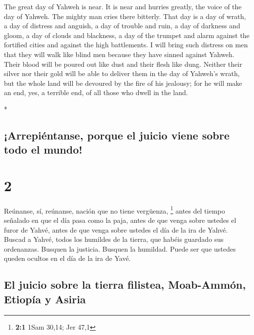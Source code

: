 \begin{paracol}{2}
\begin{otherlanguage}{english}
 The great day of Yahweh is near. It is near and hurries
greatly, the voice of the day of Yahweh. The mighty man cries there
bitterly.  That day is a day of wrath, a day of distress
and anguish, a day of trouble and ruin, a day of darkness and gloom, a
day of clouds and blackness,  a day of the trumpet and
alarm against the fortified cities and against the high battlements.
 I will bring such distress on men that they will walk
like blind men because they have sinned against Yahweh. Their blood will
be poured out like dust and their flesh like dung. 
Neither their silver nor their gold will be able to deliver them in the
day of Yahweh's wrath, but the whole land will be devoured by the fire
of his jealousy; for he will make an end, yes, a terrible end, of all
those who dwell in the land.

\end{otherlanguage}

\switchcolumn[0]*

\hypertarget{arrepiuxe9ntanse-porque-el-juicio-viene-sobre-todo-el-mundo}{%
\subsection{¡Arrepiéntanse, porque el juicio viene sobre todo el
mundo!}\label{arrepiuxe9ntanse-porque-el-juicio-viene-sobre-todo-el-mundo}}

\hypertarget{section-2}{%
\section{2}\label{section-2}}

 Reúnanse, sí, reúnanse, nación que no tiene vergüenza,
\footnote{\textbf{2:1} 1Sam 30,14; Jer 47,1}  antes del
tiempo señalado en que el día pasa como la paja, antes de que venga
sobre ustedes el furor de Yahvé, antes de que venga sobre ustedes el día
de la ira de Yahvé.  Buscad a Yahvé, todos los humildes de
la tierra, que habéis guardado sus ordenanzas. Busquen la justicia.
Busquen la humildad. Puede ser que ustedes queden ocultos en el día de
la ira de Yavé.

\hypertarget{el-juicio-sobre-la-tierra-filistea-moab-ammuxf3n-etiopuxeda-y-asiria}{%
\subsection{El juicio sobre la tierra filistea, Moab-Ammón, Etiopía y
Asiria}\label{el-juicio-sobre-la-tierra-filistea-moab-ammuxf3n-etiopuxeda-y-asiria}}


\end{paracol}
